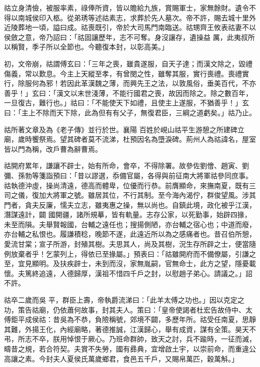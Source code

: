 \begin{pinyinscope}
 祜立身清儉，被服率素，祿俸所資，皆以贍給九族，賞賜軍士，家無餘財。遺令不得以南城侯印入柩。從弟琇等述祜素志，求葬於先人墓次。帝不許，賜去城十里外近陵葬地一頃，謚曰成。祜喪既引，帝於大司馬門南臨送。祜甥齊王攸表祜妻不以侯斂之意，帝乃詔曰：「祜固讓歷年，志不可奪。身沒讓存，遺操益
 厲，此夷叔所以稱賢，季子所以全節也。今聽復本封，以彰高美。」



 初，文帝崩，祜謂傅玄曰：「三年之喪，雖貴遂服，自天子達；而漢文除之，毀禮傷義，常以歎息。今主上天縱至孝，有曾閔之性，雖奪其服，實行喪禮。喪禮實行，除服何為邪！若因此革漢魏之薄，而興先王之法，以敦風俗，垂美百代，不亦善乎！」玄曰：「漢文以末世淺薄，不能行國君之喪，故因而除之。除之數百年，一旦復古，難行也。」祜曰：「不能使天下如禮，且使主上遂服，不猶善乎！」玄曰：「主上不除而天下除，此為但有有父子，無復君臣，三綱之道虧矣。」祜乃止。



 祜所著文章及為《老子傳》並行於世。襄陽
 百姓於峴山祜平生游憩之所建碑立廟，歲時饗祭焉。望其碑者莫不流涕，杜預因名為墮淚碑。荊州人為祜諱名，屋室皆以門為稱，改戶曹為辭曹焉。



 祜開府累年，謙讓不辟士，始有所命，會卒，不得除署。故參佐劉儈、趙寅、劉彌、孫勃等箋詣預曰：「昔以謬選，忝備官屬，各得與前征南大將軍祜參同庶事。祜執德沖虛，操尚清遠，德高而體卑，位優而行恭。前膺顯命，來撫南夏，既有三司之儀，復加大將軍之號。雖居其位，不行其制。至今海內渴佇，群俊望風。涉其門者，貪夫反廉，懦夫立志，雖夷惠之操，無以尚也。自鎮此境，政化被乎江漢，潛謀遠計，闢
 國開疆，諸所規摹，皆有軌量。志存公家，以死勤事，始辟四掾，未至而隕。夫舉賢報國，台輔之遠任也；搜揚側陋，亦台輔之宿心也；中道而廢，亦台輔之私恨也。履謙積稔，晚節不遂，此遠近所以為之感痛者也。昔召伯所憩，愛流甘棠；宣子所游，封殖其樹。夫思其人，尚及其樹，況生存所辟之士，便當隨例放棄者乎！乞蒙列上，得依已至掾屬。」預表曰：「祜雖開府而不備僚屬，引謙之至，宜見顯明。及扶疾辟士，未到而沒，家無胤嗣，官無命士，此方之望，隱憂載懷。夫篤終追遠，人德歸厚，漢祖不惜四千戶之封，以慰趙子弟心。請議之。」詔不許。



 祜卒二歲而吳
 平，群臣上壽，帝執爵流涕曰：「此羊太傅之功也。」因以克定之功，策告祜廟，仍依蕭何故事，封其夫人。策曰：「皇帝使謁者杜宏告故侍中、太傅鉅平成侯祜：昔吳為不恭，負險稱號，郊境不闢，多歷年所。祜受任南夏，思靜其難，外揚王化，內經廟略，著德推誠，江漢歸心，舉有成資，謀有全策。昊天不弔，所志不卒，朕用悼恨于厥心。乃班命群帥，致天之討，兵不踰時，一征而滅，疇昔之規，若合符契。夫賞不失勞，國有彞典，宜增啟土宇，以崇前命，而重違公高讓之素。今封夫人夏侯氏萬歲鄉君，食邑五千戶，又賜帛萬匹，穀萬斛。」




\end{pinyinscope}
